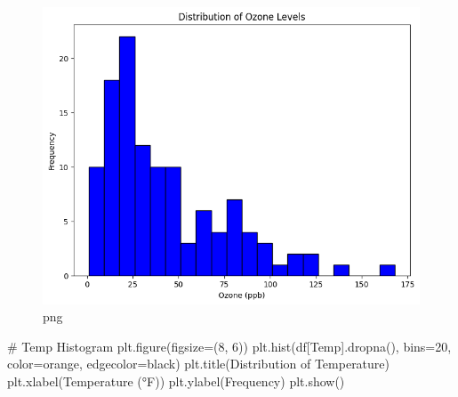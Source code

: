 \documentclass[
  letterpaper,
  DIV=11,
  numbers=noendperiod]{scrreprt}
\newenvironment{Shaded}{\begin{snugshade}}{\end{snugshade}}
\newcommand{\CommentTok}[1]{\textcolor[rgb]{0.37,0.37,0.37}{#1}}
\newcommand{\DecValTok}[1]{\textcolor[rgb]{0.68,0.00,0.00}{#1}}
\newcommand{\NormalTok}[1]{\textcolor[rgb]{0.00,0.23,0.31}{#1}}
\newcommand{\OperatorTok}[1]{\textcolor[rgb]{0.37,0.37,0.37}{#1}}
\newcommand{\StringTok}[1]{\textcolor[rgb]{0.13,0.47,0.30}{#1}}
\begin{document}
\begin{figure}[H]

{\centering \includegraphics{Tut2_Python_Olufawo_09_21_24_files/Tut2_Python_Olufawo_09_21_24_7_0.png}

}

\caption{png}

\end{figure}%

\begin{Shaded}
\begin{Highlighting}[]
\CommentTok{\# Temp Histogram}
\NormalTok{plt.figure(figsize}\OperatorTok{=}\NormalTok{(}\DecValTok{8}\NormalTok{, }\DecValTok{6}\NormalTok{))}
\NormalTok{plt.hist(df[}\StringTok{\textquotesingle{}Temp\textquotesingle{}}\NormalTok{].dropna(), bins}\OperatorTok{=}\DecValTok{20}\NormalTok{, color}\OperatorTok{=}\StringTok{\textquotesingle{}orange\textquotesingle{}}\NormalTok{, edgecolor}\OperatorTok{=}\StringTok{\textquotesingle{}black\textquotesingle{}}\NormalTok{)}
\NormalTok{plt.title(}\StringTok{\textquotesingle{}Distribution of Temperature\textquotesingle{}}\NormalTok{)}
\NormalTok{plt.xlabel(}\StringTok{\textquotesingle{}Temperature (°F)\textquotesingle{}}\NormalTok{)}
\NormalTok{plt.ylabel(}\StringTok{\textquotesingle{}Frequency\textquotesingle{}}\NormalTok{)}
\NormalTok{plt.show()}
\end{Highlighting}
\end{Shaded}
\end{document}
